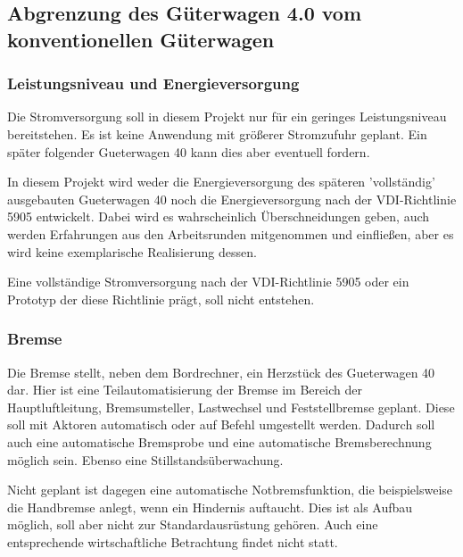 \subsection{Abgrenzung des Güterwagen 4.0 vom konventionellen Güterwagen}
\subsubsection{Leistungsniveau und Energieversorgung}
Die Stromversorgung soll in diesem Projekt nur für ein geringes Leistungsniveau bereitstehen. Es ist keine Anwendung mit größerer Stromzufuhr geplant. Ein später folgender \gls{Gueterwagen 40}  kann dies aber eventuell fordern.\par
In diesem Projekt wird weder die Energieversorgung des späteren 'vollständig' ausgebauten \gls{Gueterwagen 40} noch die Energieversorgung nach der VDI-Richtlinie 5905 entwickelt. Dabei wird es wahrscheinlich Überschneidungen geben, auch werden Erfahrungen aus den Arbeitsrunden mitgenommen und einfließen, aber es wird keine exemplarische Realisierung dessen.\par
Eine vollständige Stromversorgung nach der VDI-Richtlinie 5905 oder ein Prototyp der diese Richtlinie prägt, soll nicht entstehen. 

\subsubsection{Bremse}
Die Bremse stellt, neben dem Bordrechner, ein Herzstück des \gls{Gueterwagen 40}  dar.
Hier ist eine Teilautomatisierung der Bremse im Bereich der Hauptluftleitung, Bremsumsteller, \gls{Lastwechsel} und Feststellbremse geplant. Diese soll mit Aktoren automatisch oder auf Befehl umgestellt werden. Dadurch soll auch eine automatische Bremsprobe und eine automatische Bremsberechnung möglich sein. Ebenso eine Stillstandsüberwachung.\par
Nicht geplant ist dagegen eine automatische Notbremsfunktion, die beispielsweise die Handbremse anlegt, wenn ein Hindernis auftaucht. Dies ist als Aufbau möglich, soll aber nicht zur Standardausrüstung gehören. Auch eine entsprechende wirtschaftliche Betrachtung findet nicht statt.\par

